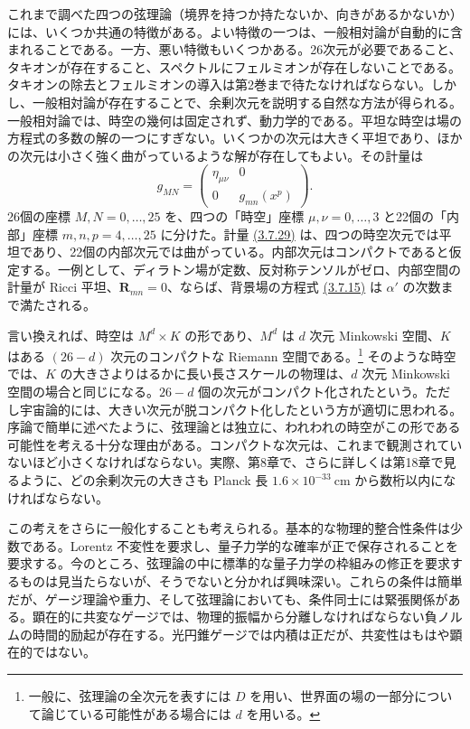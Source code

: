 これまで調べた四つの弦理論（境界を持つか持たないか、向きがあるかないか）には、いくつか共通の特徴がある。よい特徴の一つは、一般相対論が自動的に含まれることである。一方、悪い特徴もいくつかある。26次元が必要であること、タキオンが存在すること、スペクトルにフェルミオンが存在しないことである。タキオンの除去とフェルミオンの導入は第2巻まで待たなければならない。しかし、一般相対論が存在することで、余剰次元を説明する自然な方法が得られる。一般相対論では、時空の幾何は固定されず、動力学的である。平坦な時空は場の方程式の多数の解の一つにすぎない。いくつかの次元は大きく平坦であり、ほかの次元は小さく強く曲がっているような解が存在してもよい。その計量は
\begin{equation}
g_{MN}=
\begin{pmatrix}
\eta_{\mu\nu}&0\\
0&g_{mn}(x^p)
\end{pmatrix}.
\tag{3.7.29}\label{eq:3.7.29}
\end{equation}
26個の座標 $M,N=0,\ldots,25$ を、四つの「時空」座標 $\mu,\nu=0,\ldots,3$ と22個の「内部」座標 $m,n,p=4,\ldots,25$ に分けた。計量 \hyperref[eq:3.7.29]{(3.7.29)} は、四つの時空次元では平坦であり、22個の内部次元では曲がっている。内部次元はコンパクトであると仮定する。一例として、ディラトン場が定数、反対称テンソルがゼロ、内部空間の計量が Ricci 平坦、$\bm R_{mn}=0$、ならば、背景場の方程式 \hyperref[eq:3.7.15]{(3.7.15)} は $\alpha'$ の次数まで満たされる。

言い換えれば、時空は $M^d\times K$ の形であり、$M^d$ は $d$ 次元 Minkowski 空間、$K$ はある $(26-d)$ 次元のコンパクトな Riemann 空間である。\footnote[4]{一般に、弦理論の全次元を表すには $D$ を用い、世界面の場の一部分について論じている可能性がある場合には $d$ を用いる。}
そのような時空では、$K$ の大きさよりはるかに長い長さスケールの物理は、$d$ 次元 Minkowski 空間の場合と同じになる。$26-d$ 個の次元がコンパクト化されたという。ただし宇宙論的には、大きい次元が脱コンパクト化したという方が適切に思われる。序論で簡単に述べたように、弦理論とは独立に、われわれの時空がこの形である可能性を考える十分な理由がある。コンパクトな次元は、これまで観測されていないほど小さくなければならない。実際、第8章で、さらに詳しくは第18章で見るように、どの余剰次元の大きさも Planck 長 $1.6\times10^{-33}\ \mathrm{cm}$ から数桁以内になければならない。

この考えをさらに一般化することも考えられる。基本的な物理的整合性条件は少数である。Lorentz 不変性を要求し、量子力学的な確率が正で保存されることを要求する。今のところ、弦理論の中に標準的な量子力学の枠組みの修正を要求するものは見当たらないが、そうでないと分かれば興味深い。これらの条件は簡単だが、ゲージ理論や重力、そして弦理論においても、条件同士には緊張関係がある。顕在的に共変なゲージでは、物理的振幅から分離しなければならない負ノルムの時間的励起が存在する。光円錐ゲージでは内積は正だが、共変性はもはや顕在的ではない。

